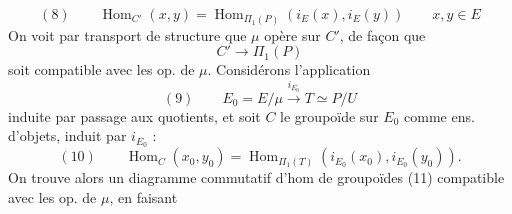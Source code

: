 \[
(8)\qquad \operatorname{Hom}_{C'}(x,y)=\operatorname{Hom}_{\Pi_1(P)}(i_E(x),i_E(y))
\qquad x,y\in E
\]
On voit par transport de structure que
$\mu$ opère sur $C'$, de façon que
\[
C'\longrightarrow\Pi_1(P)
\]
soit compatible avec les op. de $\mu$.
Considérons l'application
\[
(9)\qquad E_0=E/\mu\xrightarrow{i_{E_0}}T\simeq P/U
\]
induite par passage aux quotients, et soit
 $C$ le groupoïde sur $E_0$ comme
ens. d'objets, induit par $i_{E_0}$ :
\[
(10)\qquad \operatorname{Hom}_C(x_0,y_0)=
\operatorname{Hom}_{\Pi_1(T)}(i_{E_0}(x_0),i_{E_0}(y_0)).
\]
On trouve alors un diagramme
commutatif d'hom de groupoïdes
\quad (11)
compatible avec les op. de $\mu$, en faisant

